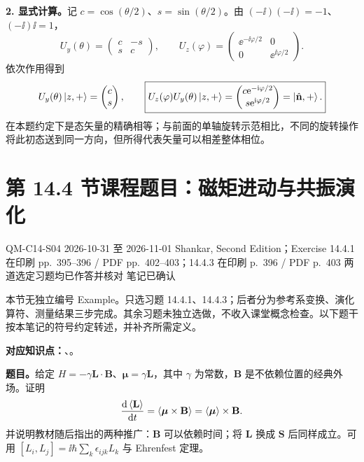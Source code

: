 \begin{checkedsolution}
\textbf{2. 显式计算。}记 $c=\cos(\theta/2)$、$s=\sin(\theta/2)$。由 $(-\ii)(-\ii)=-1$、$(-\ii)\ii=1$，
\begin{equation}
  U_y(\theta)=\begin{pmatrix}c&-s\\s&c\end{pmatrix},\qquad
  U_z(\varphi)=\begin{pmatrix}\ee^{-\ii\varphi/2}&0\\0&\ee^{\ii\varphi/2}\end{pmatrix}.
\end{equation}
依次作用得到
\begin{equation}
  U_y(\theta)\left|z,+\right\rangle=\begin{pmatrix}c\\s\end{pmatrix},\qquad
  \boxed{U_z(\varphi)U_y(\theta)\left|z,+\right\rangle
    =\begin{pmatrix}c\mathrm{e}^{-\mathrm{i}\varphi/2}\\s\mathrm{e}^{\mathrm{i}\varphi/2}\end{pmatrix}
    =\left|\hat{\mathbf n},+\right\rangle.}
\end{equation}
在本题约定下是态矢量的精确相等；与前面的单轴旋转示范相比，不同的旋转操作将此初态送到同一方向，但所得代表矢量可以相差整体相位。
\end{checkedsolution}

\section{第 14.4 节课程题目：磁矩进动与共振演化}
\label{exercises:QM-C14-S04}
\exercisemeta
  {QM-C14-S04}
  {2026-10-31 至 2026-11-01}
  {Shankar, Second Edition；Exercise 14.4.1 在印刷 pp.~395--396 / PDF pp.~402--403；14.4.3 在印刷 p.~396 / PDF p.~403}
  {两道选定习题均已作答并核对}
  {笔记已确认}

本节无独立编号 Example。只选习题 14.4.1、14.4.3；后者分为参考系变换、演化算符、测量结果三步完成。其余习题未独立选做，不收入课堂概念检查。以下题干按本笔记的符号约定转述，并补齐所需定义。

\textbf{对应知识点：}、。

\textbf{题目。}给定 $H=-\gamma\mathbf L\cdot\mathbf B$、$\boldsymbol\mu=\gamma\mathbf L$，其中 $\gamma$ 为常数，$\mathbf B$ 是不依赖位置的经典外场。证明
\begin{equation}
  \frac{\mathop{}\!\mathrm{d}\left\langle \mathbf L \right\rangle}{\mathop{}\!\mathrm{d} t}
   =\left\langle \boldsymbol\mu\times\mathbf B \right\rangle
   =\left\langle \boldsymbol\mu \right\rangle\times\mathbf B.
\end{equation}
并说明教材随后指出的两种推广：$\mathbf B$ 可以依赖时间；将 $\mathbf L$ 换成 $\mathbf S$ 后同样成立。可用 $[L_i,L_j]=\ii\hbar\sum_k\epsilon_{ijk}L_k$ 与 Ehrenfest 定理。

